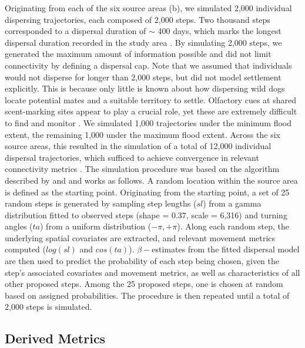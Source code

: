 \documentclass[../FinalThesis.tex]{subfiles}
\begin{document}
Originating from each of the six source areas (b), we
simulated 2,000 individual dispersing trajectories, each composed of 2,000
steps. Two thousand steps corresponded to a dispersal duration of $\sim$ 400
days, which marks the longest dispersal duration recorded in the study area
\citep{Cozzi.2020, Hofmann.2021}. By simulating 2,000 steps, we generated the
maximum amount of information possible and did not limit connectivity by
defining a dispersal cap. Note that we assumed that individuals would not
disperse for longer than 2,000 steps, but did not model settlement explicitly.
This is because only little is known about how dispersing wild dogs locate
potential mates and a suitable territory to settle. Olfactory cues at shared
scent-marking sites appear to play a crucial role, yet these are extremely
difficult to find and monitor \citep{Apps.2022, Claase.2022}. We simulated 1,000
trajectories under the minimum flood extent, the remaining 1,000 under the
maximum flood extent. Across the six source areas, this resulted in the
simulation of a total of 12,000 individual dispersal trajectories, which
sufficed to achieve convergence in relevant connectivity metrics
\citep{Hofmann.2023}. The simulation procedure was based on the algorithm
described by \citep{Signer.2017} and \citet{Hofmann.2023} and works as follows.
A random location within the source area is defined as the starting point.
Originating from the starting point, a set of 25 random steps is generated by
sampling step lengths ($sl$) from a gamma distribution fitted to observed steps
(shape = 0.37, scale = 6,316) and turning angles ($ta$) from a uniform
distribution ($-\pi, +\pi$). Along each random step, the underlying spatial
covariates are extracted, and relevant movement metrics computed ($log(sl)$ and
$cos(ta)$). \(\beta-\)estimates from the fitted dispersal model are then used to
predict the probability of each step being chosen, given the step's associated
covariates and movement metrics, as well as characteristics of all other
proposed steps. Among the 25 proposed steps, one is chosen at random based on
assigned probabilities. The procedure is then repeated until a total of 2,000
steps is simulated.

\subsection{Derived Metrics}
\end{document}

